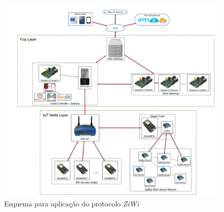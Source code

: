 \begin{figure}[H]
	\centering
	\label{fig:trab_rel_08}
	\caption{Esquema para aplicação do protocolo \textit{ZiWi}}
	\includegraphics[width=1.0\textwidth]{figuras/trabalhos_relacionados/fig08.png}
	
\end{figure}
 